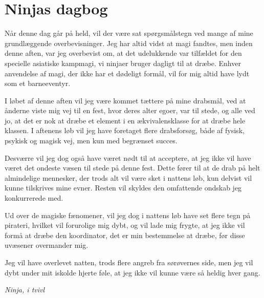 \begin{minipage}[t]{100mm}
\vspace{3mm}
\section*{Ninjas dagbog}
Når denne dag går på held, vil der være sat spørgsmålstegn ved mange af mine grundlæggende overbevisninger. Jeg har altid vidst at magi fandtes, men inden denne aften, var jeg overbevist om, at det udelukkende var tilfældet for den specielle asiatiske kampmagi, vi ninjaer bruger dagligt til at dræbe. Enhver anvendelse af magi, der ikke har et dødeligt formål, vil for mig altid have lydt som et barneeventyr.

I løbet af denne aften vil jeg være kommet tættere på mine drabsmål, ved at ånderne viste mig vej til en fest, hvor deres alter egoer, var til stede, og alle ved jo, at det er nok at dræbe et element i en ækvivalensklasse for at dræbe hele klassen. I aftenens løb vil jeg have foretaget flere drabsforsøg, både af fysisk, psykisk og magisk vej, men kun med begrænset succes.

Desværre vil jeg dog også have været nødt til at acceptere, at jeg ikke vil have været det ondeste væsen til stede på denne fest. Dette fører til at de drab på helt almindelige mennesker, der trods alt vil være sket i nattens løb, kun delvist vil kunne tilskrives mine evner. Resten vil skyldes den omfattende ondskab jeg konkurrerede med.

Ud over de magiske fænomener, vil jeg dog i nattens løb have set flere tegn på pirateri, hvilket vil forurolige mig dybt, og vil lade mig frygte, at jeg ikke vil formå at dræbe den koordinator, det er min bestemmelse at dræbe, før disse uvæsener overmander mig.

Jeg vil have overlevet natten, trods flere angreb fra sørøvernes side, men jeg vil dybt under mit iskolde hjerte føle, at jeg ikke vil kunne være så heldig hver gang.

\emph{Ninja, i tvivl}


\end{minipage}
